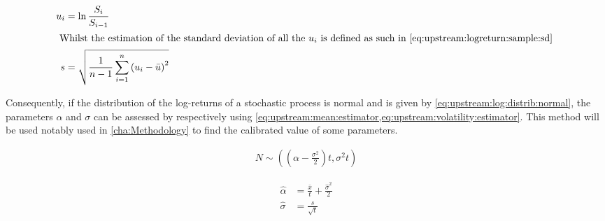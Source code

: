 \documentclass[12pt]{report}
\begin{document}
\begin{align}
  u_i &= \ln \frac{S_i}{S_{i-1}} \label{eq:upstream:logreturn:sample} \\
  \intertext{
  Whilst the estimation of the standard deviation of all the $u_i$ is defined as such in \cref{eq:upstream:logreturn:sample:sd}
  }
  s &= \sqrt{\frac{1}{n - 1} \sum_{i = 1}^n \left(u_i - \bar{u} \right) ^2} \label{eq:upstream:logreturn:sd} \\
\end{align}

Consequently, if the distribution of the log-returns of a stochastic process is normal and is given by \cref{eq:upstream:log:distrib:normal}, the parameters $\alpha$ and $\sigma$ can be assessed by respectively using \cref{eq:upstream:mean:estimator,eq:upstream:volatility:estimator}.
This method will be used notably used in \cref{cha:Methodology} to find the calibrated value of some parameters.

\begin{align}
  N \sim \left( \left( \alpha - \frac{\sigma^ 2}{2} \right) t, \sigma^2 t \right) \label{eq:upstream:log:distrib:normal}
\end{align}

\begin{align}
  \hat{\alpha} &= \frac{\bar{x}}{t} + \frac{\hat{\sigma}^2}{2} \label{eq:upstream:mean:estimator}\\
  \hat{\sigma} &= \frac{s}{\sqrt{t}} \label{eq:upstream:volatility:estimator}
\end{align}

























\end{document}
